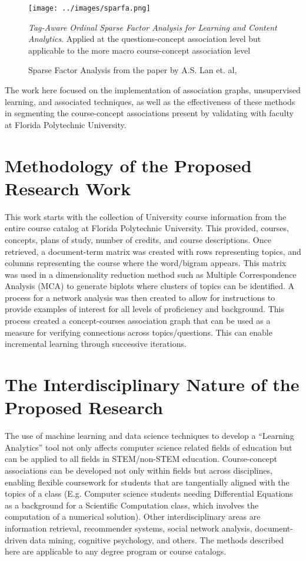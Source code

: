 \documentclass[11pt]{report}
\begin{document}
\begin{figure}[ht]
\centering

\texttt{[image: ../images/sparfa.png]}
\caption{Sparse Factor Analysis from the paper by A.S. Lan et. al, \citep{lan_tag-aware_2014}} \textit{Tag-Aware Ordinal Sparse Factor Analysis for Learning and Content Analytics}. Applied at the questions-concept association level but applicable to the more macro course-concept association level
\label{fig:sparfa}
\end{figure}



\indent The work here focused on the implementation of association graphs, unsupervised learning, and associated techniques, as well as the effectiveness of these methods in segmenting the course-concept associations present by validating with faculty at Florida Polytechnic University.

\section{Methodology of the Proposed Research Work}

This work starts with the collection of University course information from the entire course catalog at Florida Polytechnic University.  This provided, courses, concepts, plans of study, number of credits, and course descriptions. Once retrieved, a document-term matrix was created with rows representing topics, and columns representing the course where the word/bigram appears. This matrix was used in a dimensionality reduction method such as Multiple Correspondence Analysis (MCA) to generate biplots where clusters of topics can be identified. A process for a network analysis was then created to allow for instructions to provide examples of interest for all levels of proficiency and background. This process created a concept-courses association graph that can be used as a measure for verifying connections across topics/questions. This can enable incremental learning through successive iterations. 

\section{The Interdisciplinary Nature of the Proposed Research}

The use of machine learning and data science techniques to develop a  “Learning Analytics” tool not only affects computer science related fields of education but can be applied to all fields in STEM/non-STEM education. Course-concept associations can be developed not only within fields but across disciplines, enabling flexible coursework for students that are tangentially aligned with the topics of a class (E.g. Computer science students needing Differential Equations as a background for a Scientific Computation class, which involves the computation of a numerical solution). Other interdisciplinary areas are information retrieval, recommender systems, social network analysis, document-driven data mining, cognitive psychology, and others. The methods described here are applicable to any degree program or course catalogs. 
\end{document}
